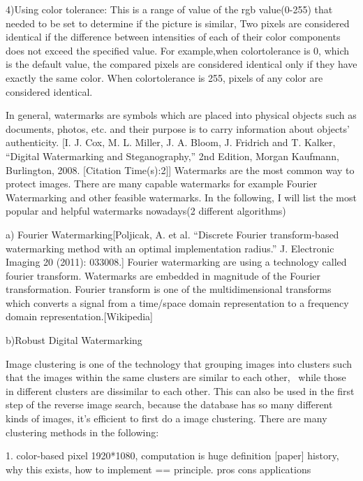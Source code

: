 4)Using color tolerance:
This is a range of value of the rgb value(0-255) that needed to be set to determine if the picture is similar,
Two pixels are considered identical if the difference between intensities of each of their color components does not exceed the specified value.
For example,when colortolerance is 0, which is the default value, the compared pixels are considered identical only if they have exactly the same color. 
When colortolerance is 255, pixels of any color are considered identical.


In general, 
watermarks are symbols which are placed into physical objects such as documents, photos, etc. and their purpose is to carry information about objects’ authenticity.
[I. J. Cox, M. L. Miller, J. A. Bloom, J. Fridrich and T. Kalker, “Digital Watermarking and Steganography,” 2nd Edition, Morgan Kaufmann, Burlington, 2008.   [Citation Time(s):2]]
Watermarks are the most common way to protect images.
There are many capable watermarks for example Fourier Watermarking and other feasible watermarks.
In the following, I will list the most popular and helpful watermarks nowadays(2 different algorithms)

a) Fourier Watermarking[Poljicak, A. et al. “Discrete Fourier transform-based watermarking method with an optimal implementation radius.” J. Electronic Imaging 20 (2011): 033008.]
Fourier watermarking are using a technology called fourier transform.
Watermarks are embedded in magnitude of the Fourier transformation.
Fourier transform is one of the multidimensional transforms which converts a signal from a time/space domain representation to a frequency domain representation.[Wikipedia]


b)Robust Digital Watermarking




Image clustering is one of the technology that grouping images into clusters such that the images within the same clusters are similar to each other, \
while those in different clusters are dissimilar to each other.
This can also be used in the first step of the reverse image search,
because the database has so many different kinds of images,
it's efficient to first do a image clustering.
There are many clustering methods in the following:

1. color-based pixel
1920*1080, computation is huge
definition [paper] \cite{}
history, why this exists, 
how to implement == principle.
pros cons
applications

